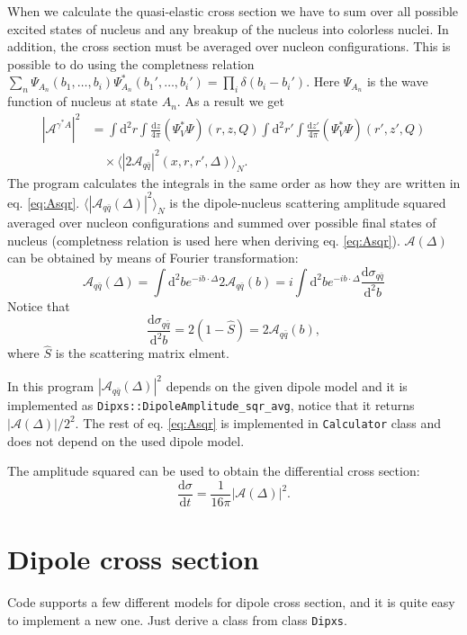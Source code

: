 \documentclass[a4paper,12pt]{article}
\newcommand{\code}[1]{\texttt{#1}}
\newcommand{\der}{\mathrm{d}}
\newcommand{\A}{\mathcal{A}}
\begin{document}
When we calculate the quasi-elastic cross section we have to sum over all possible excited states of nucleus and any breakup of the nucleus into colorless nuclei. In addition, the cross section must be averaged over nucleon configurations. This is possible to do using the completness relation $\sum_n \Psi_{A_n}(b_1,\dots,b_i) \Psi_{A_n}^*(b_1',\dots,b_i') = \prod_i \delta(b_i-b_i')$. Here $\Psi_{A_n}$ is the wave function of nucleus at state $A_n$. As a result we get
\begin{equation}
\begin{split}
	\label{eq:Asqr}
	|\A^{\gamma^* A}|^2 &= \int \der^2 r \int \frac{\der z}{4\pi} (\Psi_V^*\Psi)(r,z,Q) \int \der^2 r' \int \frac{\der z'}{4\pi} (\Psi_V^*\Psi)(r',z',Q) \\
	&\quad  \times \langle|2\A_{q\bar q}|^2(x,r,r',\Delta)\rangle_N.
\end{split}
\end{equation}
The program calculates the integrals in the same order as how they are written in eq. \eqref{eq:Asqr}. $\langle|\A_{q\bar q}(\Delta)|^2\rangle_N$ is the dipole-nucleus scattering amplitude squared averaged over nucleon configurations and summed over possible final states of nucleus (completness relation is used here when deriving eq. \eqref{eq:Asqr}). $\A(\Delta)$ can be obtained by means of Fourier transformation:
\begin{equation}
	\A_{q\bar q}(\Delta) = \int \der^2 b e^{-ib\cdot \Delta} 2\A_{q\bar q}(b) = i\int \der^2 b e^{-ib\cdot \Delta} \frac{\der \sigma_{q\bar q}}{\der^2 b}
\end{equation}
Notice that
\begin{equation}
	\frac{\der \sigma_{q\bar q}}{\der^2 b} = 2(1-\hat S) = 2\A_{q\bar q}(b),
\end{equation}
where $\hat S$ is the scattering matrix elment. 

In this program $|\A_{q\bar q}(\Delta)|^2$ depends on the given dipole model and it is implemented as \code{Dipxs::DipoleAmplitude\_sqr\_avg}, notice that it returns $|\A(\Delta)|/2^2$. The rest of eq. \eqref{eq:Asqr} is implemented in \code{Calculator} class and does not depend on the used dipole model.

The amplitude squared can be used to obtain the differential cross section:
\begin{equation}
	\frac{\der \sigma}{\der t} = \frac{1}{16\pi} |\A(\Delta)|^2 .
\end{equation}

\section{Dipole cross section}
Code supports a few different models for dipole cross section, and it is quite easy to implement a new one. Just derive a class from class \code{Dipxs}.
\end{document}
